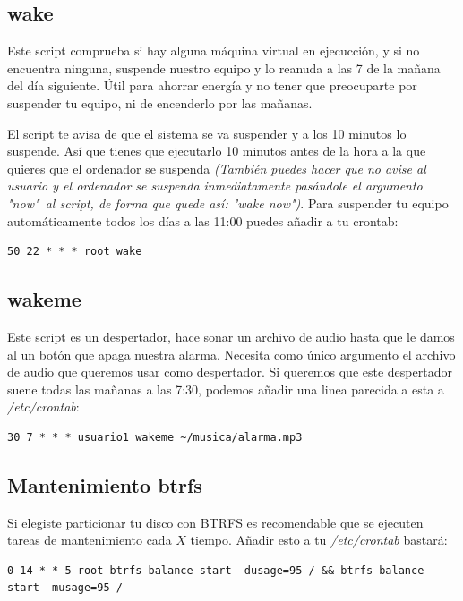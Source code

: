 \documentclass[12pt]{article}
\begin{document}
\subsection{wake}

Este script comprueba si hay alguna máquina virtual en ejecucción, y si no encuentra ninguna, suspende nuestro equipo y lo reanuda a las 7 de la mañana del día siguiente. Útil para ahorrar energía y no tener que preocuparte por suspender tu equipo, ni de encenderlo por las mañanas.

El script te avisa de que el sistema se va suspender y a los 10 minutos lo suspende. Así que tienes que ejecutarlo 10 minutos antes de la hora a la que quieres que el ordenador se suspenda \emph{(También puedes hacer que no avise al usuario y el ordenador se suspenda inmediatamente pasándole el argumento "now"\ al script, de forma que quede así: "wake now")}. Para suspender tu equipo automáticamente todos los días a las 11:00 puedes añadir a tu crontab:

\begin{verbatim}
50 22 * * * root wake
\end{verbatim}

\subsection{wakeme}

Este script es un despertador, hace sonar un archivo de audio hasta que le damos al un botón que apaga nuestra alarma. Necesita como único argumento el archivo de audio que queremos usar como despertador. Si queremos que este despertador suene todas las mañanas a las 7:30, podemos añadir una linea parecida a esta a \emph{/etc/crontab}:

\begin{verbatim}
30 7 * * * usuario1 wakeme ~/musica/alarma.mp3
\end{verbatim}

\subsection{Mantenimiento btrfs}

Si elegiste particionar tu disco con BTRFS es recomendable que se ejecuten tareas de mantenimiento cada $X$ tiempo. Añadir esto a tu \emph{/etc/crontab} bastará:

\begin{lstlisting}[basicstyle=\scriptsize\ttfamily]
0 14 * * 5 root btrfs balance start -dusage=95 / && btrfs balance start -musage=95 /
\end{lstlisting}
\end{document}
